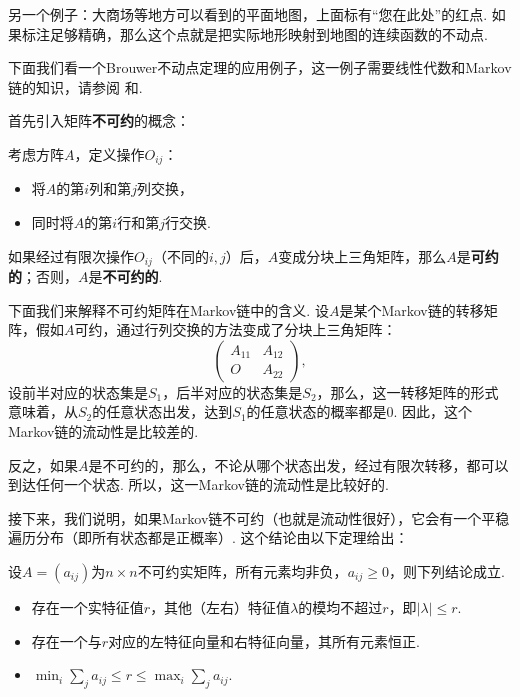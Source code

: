 另一个例子：大商场等地方可以看到的平面地图，上面标有“您在此处”的红点. 如果标注足够精确，那么这个点就是把实际地形映射到地图的连续函数的不动点.

下面我们看一个Brouwer不动点定理的应用例子，这一例子需要线性代数和Markov链的知识，请参阅 和.

首先引入矩阵\textbf{不可约}的概念：

\begin{definition}[不可约矩阵]
    考虑方阵$A$，定义操作$O_{ij}$：
    \begin{itemize}
        \item 将$A$的第$i$列和第$j$列交换，
        \item 同时将$A$的第$i$行和第$j$行交换.
    \end{itemize}

    如果经过有限次操作$O_{ij}$（不同的$i,j$）后，$A$变成分块上三角矩阵，那么$A$是\textbf{可约的}；否则，$A$是\textbf{不可约的}.
\end{definition}

下面我们来解释不可约矩阵在Markov链中的含义. 设$A$是某个Markov链的转移矩阵，假如$A$可约，通过行列交换的方法变成了分块上三角矩阵：
\[\begin{pmatrix}
    A_{11} & A_{12}\\
    O & A_{22}
\end{pmatrix},\]
设前半对应的状态集是$S_1$，后半对应的状态集是$S_2$，那么，这一转移矩阵的形式意味着，从$S_2$的任意状态出发，达到$S_1$的任意状态的概率都是$0$. 因此，这个Markov链的流动性是比较差的. 

反之，如果$A$是不可约的，那么，不论从哪个状态出发，经过有限次转移，都可以到达任何一个状态. 所以，这一Markov链的流动性是比较好的.

接下来，我们说明，如果Markov链不可约（也就是流动性很好），它会有一个平稳遍历分布（即所有状态都是正概率）. 这个结论由以下定理给出：

\begin{theorem}\label{thm:perron-frobenius}
    设$A=(a_{ij})$为$n\times n$不可约实矩阵，所有元素均非负，$a_{ij}\geq 0$，则下列结论成立.
    \begin{itemize}
        \item 存在一个实特征值$r$，其他（左右）特征值$\lambda$的模均不超过$r$，即$|\lambda|\leq r$.
        \item 存在一个与$r$对应的左特征向量和右特征向量，其所有元素恒正.
        \item $\min_i\sum_{j}a_{ij}\leq r\leq \max_i\sum_j a_{ij}$.
    \end{itemize}
\end{theorem}

